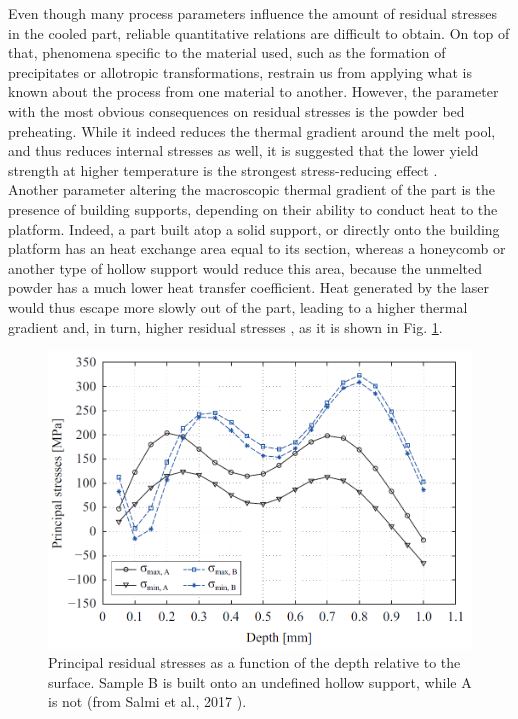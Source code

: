 Even though many process parameters influence the amount of residual stresses in the cooled part, reliable quantitative relations are difficult to obtain. On top of that, phenomena specific to the material used, such as the formation of precipitates or allotropic transformations, restrain us from applying what is known about the process from one material to another. However, the parameter with the most obvious consequences on residual stresses is the powder bed preheating. While it indeed reduces the thermal gradient around the melt pool, and thus reduces internal stresses as well, it is suggested that the lower yield strength at higher temperature is the strongest stress-reducing effect \cite{Vrancken2016}. \\

Another parameter altering the macroscopic thermal gradient of the part is the presence of building supports, depending on their ability to conduct heat to the platform. Indeed, a part built atop a solid support, or directly onto the building platform has an heat exchange area equal to its section, whereas a honeycomb or another type of hollow support would reduce this area, because the unmelted powder has a much lower heat transfer coefficient\cite{Hodge2014}. Heat generated by the laser would thus escape more slowly out of the part, leading to a higher thermal gradient and, in turn, higher residual stresses \cite{Salmi2017}, as it is shown in Fig. \ref{fig:rs_support}.\\

\begin{figure}[ht]
	\centering
	\includegraphics[scale=0.50]{Images/Rs-support}
	\decoRule
	\caption[Principal residual stresses as a function of the depth relative to the surface. Sample B is built onto an undefined hollow support, while A is not]{Principal residual stresses as a function of the depth relative to the surface. Sample B is built onto an undefined hollow support, while A is not (from Salmi et al., 2017 \parencite{Salmi2017}).}
	\label{fig:rs_support}
\end{figure}

